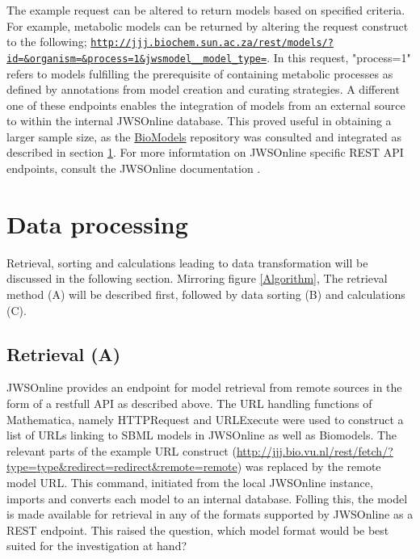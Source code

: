 The example request can be altered to return models based on specified criteria. For example, metabolic models can be returned by altering the request construct to the following; \href{http://jjj.biochem.sun.ac.za/rest/models/?id=&organism=&process=1&jwsmodel__model_type=}{\nolinkurl{http://jjj.biochem.sun.ac.za/rest/models/?id=\&organism=\&process=1\&jwsmodel\_\_model\_type=}}. In this request, "process=1" refers to models fulfilling the prerequisite of containing metabolic processes as defined by annotations from model creation and curating strategies. A different one of these endpoints enables the integration of models from an external source to within the internal JWSOnline database. This proved useful in obtaining a larger sample size, as the \href{https://www.ebi.ac.uk/biomodels-main/}{BioModels} repository was consulted and integrated as described in section \ref{Data processing}. For more informtation on JWSOnline specific REST API endpoints, consult the JWSOnline documentation \cite{jwsdocs}. 

\section{Data processing} \label{Data processing}
Retrieval, sorting and calculations leading to data transformation will be discussed in the following section. Mirroring figure \ref{Algorithm}, The retrieval method (A) will be described first, followed by data sorting (B) and calculations (C). 

\subsection{Retrieval (A)} \label{Retrieval}
JWSOnline provides an endpoint for model retrieval from remote sources in the form of a restfull API as described above. The URL handling functions of Mathematica, namely HTTPRequest and URLExecute were used to construct a list of URLs linking to SBML models in JWSOnline as well as Biomodels. The relevant parts of the example URL construct (\href{http://jjj.bio.vu.nl/rest/fetch/?type={type}&redirect={redirect}&remote={remote}}{http://jjj.bio.vu.nl/rest/fetch/?type={type}&redirect={redirect}&remote={remote}}) was replaced by the remote model URL. This command, initiated from the local JWSOnline instance, imports and converts each model to an internal database. Folling this, the model is made available for retrieval in any of the formats supported by JWSOnline as a REST endpoint. This raised the question, which model format would be best suited for the investigation at hand?

